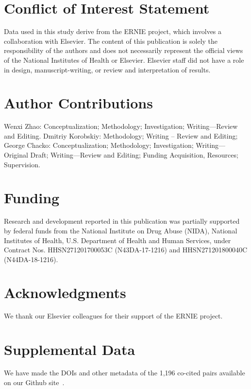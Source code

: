 \documentclass[utf8]{frontiersSCNS}
\begin{document}

\section*{Conflict of Interest Statement} Data used in this study derive from the ERNIE project, which involves a collaboration with Elsevier. The content of this publication is solely the responsibility of the authors and does not necessarily represent the official views of the National Institutes of Health or Elsevier.  Elsevier staff did not have a role in design, manuscript-writing, or review and interpretation of results. 

\section*{Author Contributions}

Wenxi Zhao: Conceptualization; Methodology; Investigation; Writing—Review and Editing. Dmitriy Korobskiy: Methodology; Writing – Review and Editing; George Chacko: Conceptualization; Methodology; Investigation; Writing—Original Draft; Writing—Review and Editing; Funding Acquisition, Resources; Supervision.

\section*{Funding} Research and development reported in this publication was partially supported by federal funds from the National Institute on Drug Abuse (NIDA), National Institutes of Health, U.S. Department of Health and Human Services, under Contract Nos. HHSN271201700053C (N43DA-17-1216) and HHSN271201800040C (N44DA-18-1216).

\section*{Acknowledgments} We thank our Elsevier colleagues for their support of the ERNIE project. 

\section*{Supplemental Data} We have made the DOIs and other metadata of the 1,196 co-cited pairs available on our Github site~\citep{Korobskiy2019}.
\end{document}
